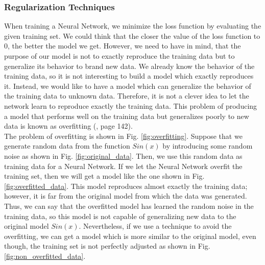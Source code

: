\subsubsection{Regularization Techniques}
When training a Neural Network, we minimize the loss function by evaluating the given training set. We could think that the closer the value of the loss function to $0$, the better the model we get. However, we need to have in mind, that the purpose of our model is not to exactly reproduce the training data but to generalize its behavior to brand new data. We already know the behavior of the training data, so it is not interesting to build a model which exactly reproduces it. Instead, we would like to have a model which can generalize the behavior of the training data to unknown data. Therefore, it is not a clever idea to let the network learn to reproduce exactly the training data. This problem of producing a model that performs well on the training data but generalizes poorly to new data is known as overfitting (\cite{data_sience}, page 142).\\

The problem of overfitting is shown in Fig. \ref{fig:overfitting}. Suppose that we generate random data from the function $Sin(x)$ by introducing some random noise as shown in Fig. \ref{fig:original_data}. Then, we use this random data as training data for a Neural Network. If we let the Neural Network overfit the training set, then we will get a model like the one shown in Fig. \ref{fig:overfitted_data}. This model reproduces almost exactly the training data; however, it is far from the original model from which the data was generated. Thus, we can say that the overfitted model has learned the random noise in the training data, so this model is not capable of generalizing new data to the original model $Sin(x)$. Nevertheless, if we use a technique to avoid the overfitting, we can get a model which is more similar to the original model, even though, the training set is not perfectly adjusted as shown in Fig. \ref{fig:non_overfitted_data}.\\

